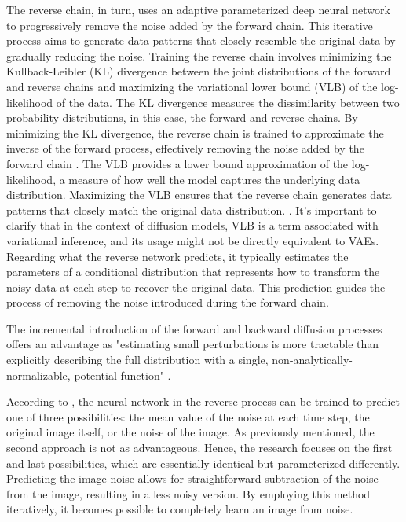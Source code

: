 The reverse chain, in turn, uses an adaptive parameterized deep neural network to progressively remove the noise added by the forward chain. This iterative process aims to generate data patterns that closely resemble the original data by gradually reducing the noise. Training the reverse chain involves minimizing the Kullback-Leibler (KL) divergence between the joint distributions of the forward and reverse chains and maximizing the variational lower bound (VLB) of the log-likelihood of the data. The KL divergence measures the dissimilarity between two probability distributions, in this case, the forward and reverse chains. By minimizing the KL divergence, the reverse chain is trained to approximate the inverse of the forward process, effectively removing the noise added by the forward chain \citep{sohlDDPM}. The VLB provides a lower bound approximation of the log-likelihood, a measure of how well the model captures the underlying data distribution. Maximizing the VLB ensures that the reverse chain generates data patterns that closely match the original data distribution. \citep{hoDDPMs, sohlDDPM}. It's important to clarify that in the context of diffusion models, VLB is a term associated with variational inference, and its usage might not be directly equivalent to VAEs. Regarding what the reverse network predicts, it typically estimates the parameters of a conditional distribution that represents how to transform the noisy data at each step to recover the original data. This prediction guides the process of removing the noise introduced during the forward chain.

The incremental introduction of the forward and backward diffusion processes offers an advantage as "estimating small perturbations is more tractable than explicitly describing the full distribution with a single, non-analytically-normalizable, potential function" \citep{sohlDDPM}.

According to \citep{hoDDPMs}, the neural network in the reverse process can be trained to predict one of three possibilities: the mean value of the noise at each time step, the original image itself, or the noise of the image. As previously mentioned, the second approach is not as advantageous. Hence, the research focuses on the first and last possibilities, which are essentially identical but parameterized differently. Predicting the image noise allows for straightforward subtraction of the noise from the image, resulting in a less noisy version. By employing this method iteratively, it becomes possible to completely learn an image from noise.


